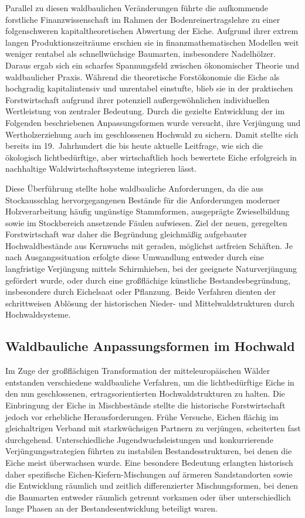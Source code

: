 \documentclass[twocolumn, bibliography=totoc, abstract=true]{scrartcl}
\begin{document}
Parallel zu diesen waldbaulichen Veränderungen führte die aufkommende forstliche Finanzwissenschaft im Rahmen der Bodenreinertragslehre zu einer folgenschweren kapitaltheoretischen Abwertung der Eiche. Aufgrund ihrer extrem langen Produktionszeiträume erschien sie in finanzmathematischen Modellen weit weniger rentabel als schnellwüchsige Baumarten, insbesondere Nadelhölzer. Daraus ergab sich ein scharfes Spannungsfeld zwischen ökonomischer Theorie und waldbaulicher Praxis. Während die theoretische Forstökonomie die Eiche als hochgradig kapitalintensiv und unrentabel einstufte, blieb sie in der praktischen Forstwirtschaft aufgrund ihrer potenziell außergewöhnlichen individuellen Wertleistung von zentraler Bedeutung. Durch die gezielte Entwicklung der im Folgenden beschriebenen Anpassungsformen wurde versucht, ihre Verjüngung und Wertholzerziehung auch im geschlossenen Hochwald zu sichern. Damit stellte sich bereits im 19.~Jahrhundert die bis heute aktuelle Leitfrage, wie sich die ökologisch lichtbedürftige, aber wirtschaftlich hoch bewertete Eiche erfolgreich in nachhaltige Waldwirtschaftssysteme integrieren lässt.

Diese Überführung stellte hohe waldbauliche Anforderungen, da die aus Stockausschlag hervorgegangenen Bestände für die Anforderungen moderner Holzverarbeitung häufig ungünstige Stammformen, ausgeprägte Zwieselbildung sowie im Stockbereich ansetzende Fäulen aufwiesen. Ziel der neuen, geregelten Forstwirtschaft war daher die Begründung gleichmäßig aufgebauter Hochwaldbestände aus Kernwuchs mit geraden, möglichst astfreien Schäften. Je nach Ausgangssituation erfolgte diese Umwandlung entweder durch eine langfristige Verjüngung mittels Schirmhieben, bei der geeignete Naturverjüngung gefördert wurde, oder durch eine großflächige künstliche Bestandesbegründung, insbesondere durch Eichelsaat oder Pflanzung. Beide Verfahren dienten der schrittweisen Ablösung der historischen Nieder- und Mittelwaldstrukturen durch Hochwaldsysteme.

\subsection{Waldbauliche Anpassungsformen im Hochwald}

Im Zuge der großflächigen Transformation der mitteleuropäischen Wälder entstanden verschiedene waldbauliche Verfahren, um die lichtbedürftige Eiche in den nun geschlossenen, ertragsorientierten Hochwaldstrukturen zu halten. Die Einbringung der Eiche in Mischbestände stellte die historische Forstwirtschaft jedoch vor erhebliche Herausforderungen. Frühe Versuche, Eichen flächig im gleichaltrigen Verband mit starkwüchsigen Partnern zu verjüngen, scheiterten fast durchgehend. Unterschiedliche Jugendwuchsleistungen und konkurrierende Verjüngungsstrategien führten zu instabilen Bestandesstrukturen, bei denen die Eiche meist überwachsen wurde. Eine besondere Bedeutung erlangten historisch daher spezifische Eichen-Kiefern-Mischungen auf ärmeren Sandstandorten sowie die Entwicklung räumlich und zeitlich differenzierter Mischungsformen, bei denen die Baumarten entweder räumlich getrennt vorkamen oder über unterschiedlich lange Phasen an der Bestandesentwicklung beteiligt waren.
\end{document}
